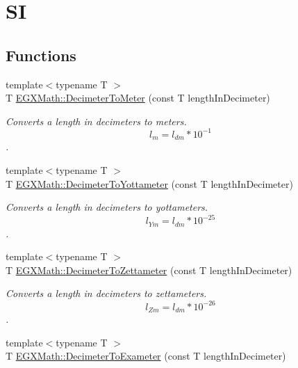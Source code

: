 \hypertarget{group___e_g_x_math-_conversions-_length_conversions-_s_i-_decimeter-_s_i}{}\section{SI}
\label{group___e_g_x_math-_conversions-_length_conversions-_s_i-_decimeter-_s_i}
\subsection*{Functions}
\begin{DoxyCompactItemize}
\item 
{\footnotesize template$<$typename T $>$ }\\T \mbox{\hyperlink{group___e_g_x_math-_conversions-_length_conversions-_s_i-_decimeter-_s_i_ga51fdff755420d79cc7c4cab051a1e820}{E\+G\+X\+Math\+::\+Decimeter\+To\+Meter}} (const T length\+In\+Decimeter)
\begin{DoxyCompactList}\small\item\em Converts a length in decimeters to meters. \[ l_{m}=l_{dm} * 10^{-1} \]. \end{DoxyCompactList}\item 
{\footnotesize template$<$typename T $>$ }\\T \mbox{\hyperlink{group___e_g_x_math-_conversions-_length_conversions-_s_i-_decimeter-_s_i_ga47bb0274bb352706479e9f103686669b}{E\+G\+X\+Math\+::\+Decimeter\+To\+Yottameter}} (const T length\+In\+Decimeter)
\begin{DoxyCompactList}\small\item\em Converts a length in decimeters to yottameters. \[ l_{Ym}=l_{dm} * 10^{-25} \]. \end{DoxyCompactList}\item 
{\footnotesize template$<$typename T $>$ }\\T \mbox{\hyperlink{group___e_g_x_math-_conversions-_length_conversions-_s_i-_decimeter-_s_i_ga11b07d4dcd18209ab0b2cb3b2f0bdb59}{E\+G\+X\+Math\+::\+Decimeter\+To\+Zettameter}} (const T length\+In\+Decimeter)
\begin{DoxyCompactList}\small\item\em Converts a length in decimeters to zettameters. \[ l_{Zm}=l_{dm} * 10^{-26} \]. \end{DoxyCompactList}\item 
{\footnotesize template$<$typename T $>$ }\\T \mbox{\hyperlink{group___e_g_x_math-_conversions-_length_conversions-_s_i-_decimeter-_s_i_ga9ee5daca58b2e6431c94ca9b8d5180b6}{E\+G\+X\+Math\+::\+Decimeter\+To\+Exameter}} (const T length\+In\+Decimeter)

\end{DoxyCompactItemize}
